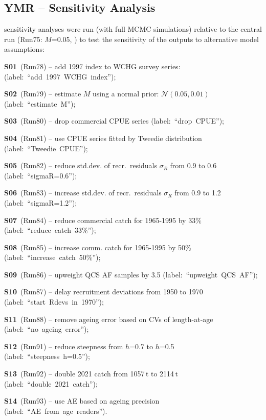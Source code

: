 \documentclass[11pt]{book}
\newcommand{\pc}{\%}
\begin{document}
\subsection{YMR -- Sensitivity Analysis}\label{ss:sensruns} 


 sensitivity analyses were run (with full MCMC simulations) relative to the central run (Run75: $M$=0.05, ) to test the sensitivity of the outputs to alternative model assumptions:
\vspace{-0.5\baselineskip}%
\begin{itemize_csas}
  \item \textbf{S01}~(Run78)  -- add 1997 index to WCHG survey series: (label:~``add~1997~WCHG~index'');
  \item \textbf{S02}~(Run79)  -- estimate $M$ using a normal prior: $\mathcal{N}(0.05,0.01)$ (label:~``estimate~M'');
  \item \textbf{S03}~(Run80)  -- drop commercial CPUE series  (label:~``drop~CPUE'');
  \item \textbf{S04}~(Run81)  -- use CPUE series fitted by Tweedie distribution (label:~``Tweedie~CPUE'');
  \item \textbf{S05}~(Run82)  -- reduce std.dev. of recr.~residuals $\sigma_R$ from 0.9 to 0.6  (label:~``sigmaR=0.6'');
  \item \textbf{S06}~(Run83)  -- increase std.dev. of recr.~residuals $\sigma_R$ from 0.9 to 1.2 (label:~``sigmaR=1.2'');
  \item \textbf{S07}~(Run84)  -- reduce commercial catch for 1965-1995 by 33\pc{} (label:~``reduce~catch~33\%'');
  \item \textbf{S08}~(Run85)  -- increase comm. catch for 1965-1995 by 50\pc{} (label:~``increase~catch~50\%'');
  \item \textbf{S09}~(Run86)  -- upweight QCS AF samples by 3.5 (label:~``upweight~QCS~AF'');
  \item \textbf{S10}~(Run87) -- delay recruitment deviations from 1950 to 1970 (label:~``start~Rdevs~in~1970'');
  \item \textbf{S11}~(Run88) -- remove ageing error based on CVs of length-at-age (label:~``no~ageing~error'');
  \item \textbf{S12}~(Run91) -- reduce steepness from $h$=0.7 to $h$=0.5 (label:~``steepness~h=0.5'');
  \item \textbf{S13}~(Run92) -- double 2021 catch from 1057\,t to 2114\,t (label:~``double~2021~catch'');
  \item \textbf{S14}~(Run93) -- use AE based on ageing precision (label:~``AE~from~age~readers'').
\end{itemize_csas}
\end{document}
